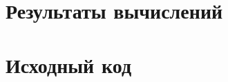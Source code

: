 \newpage
\section{ Результаты вычислений}
\label{c:app_results}





\newpage
\section{ Исходный код}
\label{c:listings}
\renewcommand{\thelstlisting}{Г.1}

% 
\renewcommand{\thelstlisting}{Г.2}

\renewcommand{\thelstlisting}{Г.3}

